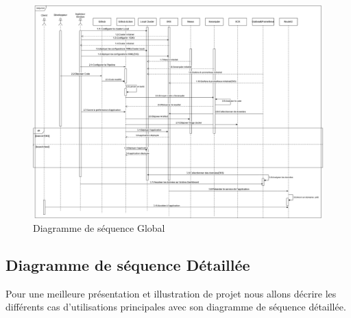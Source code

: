             \begin{landscape}
              \begin{figure}[htbp]
                \centering
                \includegraphics[width=24cm]{Squence.drawio.png} %
                \caption{Diagramme de séquence Global}
              
              \end{figure}
            \end{landscape}
            \subsection{\selectfont\Large Diagramme de séquence Détaillée}
            \textsf{\selectfont{}Pour une meilleure présentation et illustration de projet nous allons décrire les différents cas d'utilisations principales avec son diagramme de séquence détaillée.}
